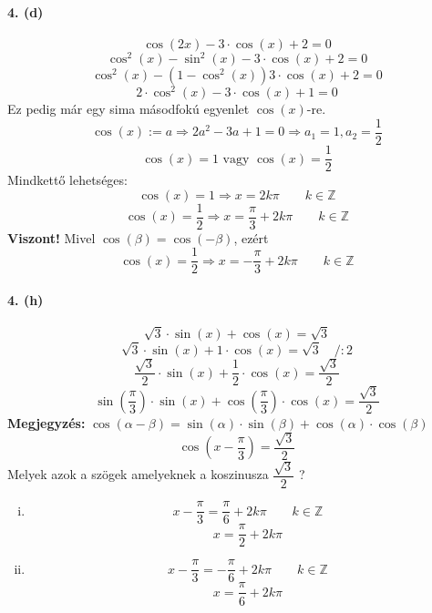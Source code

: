 \documentclass[12pt,a4paper,fleqn]{article}
\newcommand{\myparagraph}[1]{\paragraph{#1}\mbox{}}
\begin{document}
\myparagraph{4. (d)}
\[ \cos(2x) - 3 \cdot \cos(x) + 2 = 0 \]
\[ \cos^2(x) - \sin^2(x) - 3 \cdot \cos(x) + 2 = 0 \]
\[ \cos^2(x) - (1- \cos^2(x)) 3 \cdot \cos(x) + 2 = 0 \]
\[ 2 \cdot \cos^2(x) - 3 \cdot \cos(x) + 1 = 0 \]
Ez pedig már egy sima másodfokú egyenlet $\cos(x)$-re.
\[ \cos(x) := a \Rightarrow 2a^2 - 3a + 1 = 0 \Rightarrow a_1 = 1, a_2 = \frac{1}{2} \]
\[ \cos(x) = 1 \text{ vagy } \cos(x) = \frac{1}{2}\]
Mindkettő lehetséges:
\[ \cos(x) = 1 \Rightarrow x = 2k\pi \qquad k \in \mathbb{Z} \]
\[ \cos(x) = \dfrac{1}{2} \Rightarrow x = \dfrac{\pi}{3} + 2k\pi \qquad k \in \mathbb{Z} \]
\textbf{Viszont!} Mivel $\cos(\beta) = \cos(-\beta)$, ezért
\[ \cos(x) = \dfrac{1}{2} \Rightarrow x = -\dfrac{\pi}{3} + 2k\pi \qquad k \in \mathbb{Z} \]

\myparagraph{4. (h)}
\[ \sqrt{3} \cdot \sin(x) + \cos(x) = \sqrt{3} \]
\[ \sqrt{3} \cdot \sin(x) + 1 \cdot \cos(x) = \sqrt{3} \quad /:2 \]
\[ \dfrac{\sqrt{3}}{2} \cdot \sin(x) + \dfrac{1}{2} \cdot \cos(x) = \dfrac{\sqrt{3}}{2} \]
\[ \sin\left(\dfrac{\pi}{3}\right) \cdot \sin(x) +
\cos\left(\dfrac{\pi}{3}\right) \cdot \cos(x) = \dfrac{\sqrt{3}}{2} \]
\textbf{Megjegyzés:} $\cos(\alpha - \beta) =
  \sin(\alpha) \cdot \sin(\beta) + \cos(\alpha) \cdot \cos(\beta) $
\[ \cos\left( x - \dfrac{\pi}{3} \right) = \dfrac{\sqrt{3}}{2} \]
Melyek azok a szögek amelyeknek a koszinusza $\dfrac{\sqrt{3}}{2}$ ?


\clearpage

\begin{enumerate}[i.]
  \item
  \[ x - \dfrac{\pi}{3} = \dfrac{\pi}{6} + 2k\pi \qquad k \in \mathbb{Z} \]
  \[ x = \dfrac{\pi}{2} + 2k\pi \]
  \item
  \[ x - \dfrac{\pi}{3} = -\dfrac{\pi}{6} + 2k\pi \qquad k \in \mathbb{Z} \]
  \[ x = \dfrac{\pi}{6} + 2k\pi \]
\end{enumerate}
\end{document}

